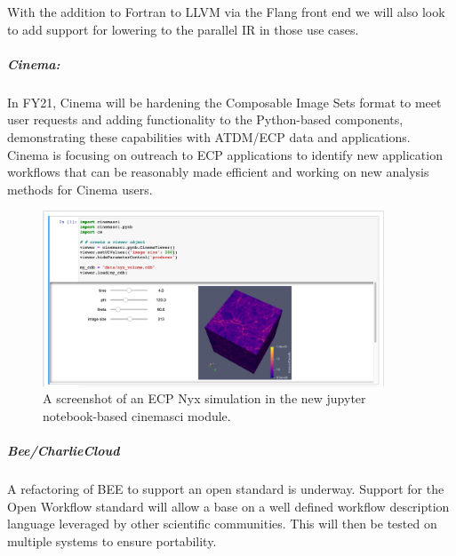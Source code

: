 With the addition to Fortran to LLVM via the Flang front end we will
also look to add support for lowering to the parallel IR in those
use cases.

\subparagraph{Cinema:}
In FY21, Cinema will be hardening the Composable Image Sets format to meet user requests and adding functionality to the Python-based components, demonstrating these capabilities with ATDM/ECP data and applications.  Cinema is focusing on outreach to ECP applications to identify new application workflows that can be reasonably made efficient and working on new analysis methods for Cinema users.


\begin{figure}[htb]
	\centering
	\includegraphics[width=4in]{projects/2.3.6-NNSA/2.3.6.01-LANL-ATDM/cinema-jnc-nyx-volume.png}
	\caption{
		A screenshot of an ECP Nyx simulation in the new jupyter notebook-based cinemasci module.  
	\label{fig:cinemasci-nyxexample}
	}
\end{figure}

\subparagraph{Bee/CharlieCloud}
A refactoring of BEE to support an open standard is underway. Support for the Open Workflow standard will allow a base on a well defined workflow description language leveraged by other scientific communities. This will then be tested on multiple systems to ensure portability.
